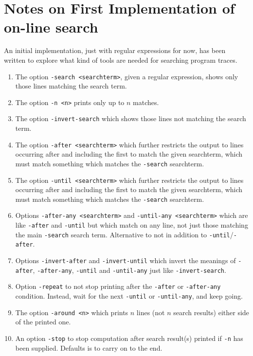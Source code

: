 \documentclass[10pt]{article}
\begin{document}
\section{Notes on First Implementation of on-line search}

An initial implementation, just with regular expressions for now, has been written to explore what kind of tools are needed for searching program traces.

\begin{enumerate}
\item The option \texttt{-search <searchterm>}, given a regular expression, shows only those lines matching the search term.
\item The option \texttt{-n <n>} prints only up to $n$ matches.
\item The option \texttt{-invert-search} which shows those lines not matching the search term.
\item The option \texttt{-after <searchterm>} which further restricts the output to lines occurring after and including the first to match the given searchterm, which must match something which matches the \texttt{-search} searchterm.
\item The option \texttt{-until <searchterm>} which further restricts the output to lines occurring after and including the first to match the given searchterm, which must match something which matches the \texttt{-search} searchterm. 
\item Options \texttt{-after-any <searchterm>} and \texttt{-until-any <searchterm>} which are like \texttt{-after} and \texttt{-until} but which match on any line, not just those matching the main \texttt{-search} search term. Alternative to not in addition to \texttt{-until}/\texttt{-after}.
\item Options \texttt{-invert-after} and \texttt{-invert-until} which invert the meanings of \texttt{-after}, \texttt{-after-any}, \texttt{-until} and \texttt{-until-any} just like \texttt{-invert-search}.
\item Option \texttt{-repeat} to not stop printing after the \texttt{-after} or \texttt{-after-any} condition. Instead, wait for the next \texttt{-until} or \texttt{-until-any}, and keep going.
\item The option \texttt{-around <n>} which prints $n$ lines (not $n$ search results) either side of the printed one.
\item An option \texttt{-stop} to stop computation after search result(s) printed if \texttt{-n} has been supplied. Defaults is to carry on to the end.
\end{enumerate}
\end{document}
